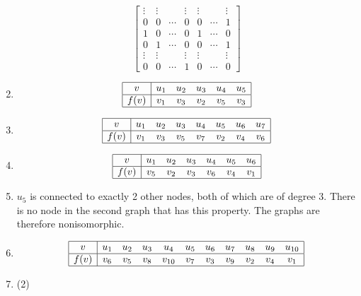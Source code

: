 \documentclass[12pt, A4]{article}
\newcommand{\enumset}[1]{\setcounter{enumi}{#1}}
\begin{document}
\begin{enumerate}
\begin{tasks}
\[\begin{bmatrix}
								\vdots & \vdots & & \vdots & \vdots & & \vdots \\
								0 & 0 & \cdots & 0 & 0 & \cdots & 1 \\
								1 & 0 & \cdots & 0 & 1 & \cdots & 0 \\
								0 & 1 & \cdots & 0 & 0 & \cdots & 1 \\
								\vdots & \vdots & & \vdots & \vdots & & \vdots \\
								0 & 0 & \cdots & 1 & 0 & \cdots & 0
							\end{bmatrix}\]
					\end{tasks}
				\enumset{38}
				\item
					\[\begin{array}{|c|*{5}{c}|}\hline
						v & u_1 & u_2 & u_3 & u_4 & u_5 \\\hline
						f(v) & v_1 & v_3 & v_2 & v_5 & v_3 \\\hline
					\end{array}\]
				\enumset{40}
				\item
					\[\begin{array}{|c|*{7}{c}|}\hline
						v & u_1 & u_2 & u_3 & u_4 & u_5 & u_6 & u_7 \\\hline
						f(v) & v_1 & v_3 & v_5 & v_7 & v_2 & v_4 & v_6  \\\hline
					\end{array}\]
				\enumset{42}
				\item
					\[\begin{array}{|c|*{6}{c}|}\hline
						v & u_1 & u_2 & u_3 & u_4 & u_5 & u_6 \\\hline
						f(v) & v_5 & v_2 & v_3 & v_6 & v_4 & v_1 \\\hline
					\end{array}\]
				\enumset{44}
				\item
					\(u_5\) is connected to exactly 2 other nodes, both of which are of degree \(3\). There is no node in the second graph that has this property. The graphs are therefore nonisomorphic.
				\enumset{46}
				\item
					\[\begin{array}{|c|*{10}{c}|}\hline
						v & u_1 & u_2 & u_3 & u_4 & u_5 & u_6 & u_7 & u_8 & u_9 & u_{10} \\\hline
						f(v) & v_6 & v_5 & v_8 & v_{10} & v_7 & v_3 & v_9 & v_2 & v_4 & v_1 \\\hline
					\end{array}\]
				\enumset{62}
				\item
					\begin{tasks}(2)

\end{tasks}
\end{enumerate}
\end{document}
